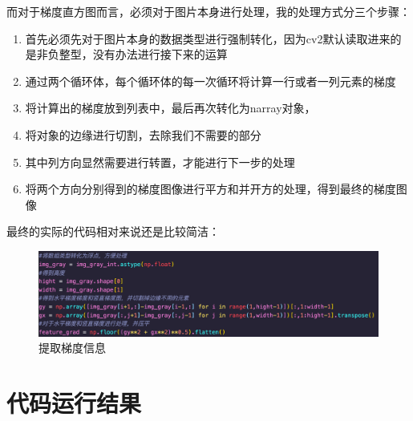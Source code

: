 \documentclass[UTF8]{ctexart}
\begin{document}
            而对于梯度直方图而言，必须对于图片本身进行处理，我的处理方式分三个步骤：
            \begin{enumerate}
                \item 首先必须先对于图片本身的数据类型进行强制转化，因为cv2默认读取进来的是非负整型，没有办法进行接下来的运算
                \item 通过两个循环体，每个循环体的每一次循环将计算一行或者一列元素的梯度
                \item 将计算出的梯度放到列表中，最后再次转化为narray对象，
                \item 将对象的边缘进行切割，去除我们不需要的部分
                \item 其中列方向显然需要进行转置，才能进行下一步的处理
                \item 将两个方向分别得到的梯度图像进行平方和并开方的处理，得到最终的梯度图像
            \end{enumerate}

            最终的实际的代码相对来说还是比较简洁：
            \begin{figure}[H]
                \centering
                \includegraphics[scale=0.35]{img/grad.png}
                \caption{提取梯度信息}
            \end{figure}

    \section{代码运行结果}
\end{document}
